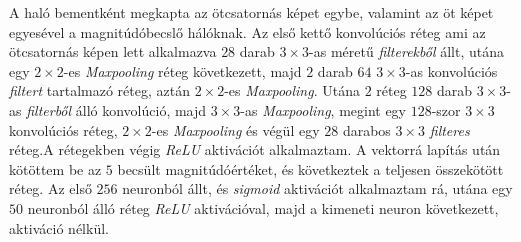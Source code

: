 \documentclass[12pt,letterpaper,oneside,openright]{book}
\begin{document}
A haló bementként megkapta az ötcsatornás képet egybe, valamint az öt képet egyesével a magnitúdóbecslő hálóknak. Az első kettő konvolúciós réteg ami az ötcsatornás képen lett alkalmazva $28$ darab $3\times3$-as méretű \textit{filterekből} állt, utána egy $2\times 2$-es \textit{Maxpooling} réteg következett, majd $2$ darab $64$ $3\times 3$-as konvolúciós \textit{filtert} tartalmazó réteg, aztán $2\times 2$-es \textit{Maxpooling}. Utána $2$ réteg $128$ darab $3\times 3$-as \textit{filterből} álló konvolúció, majd $3\times 3$-as \textit{Maxpooling}, megint egy $128$-szor $3\times 3$ konvolúciós réteg, $2\times 2$-es \textit{Maxpooling} és végül egy $28$ darabos $3\times 3$ \textit{filteres} réteg.A rétegekben végig \textit{ReLU} aktivációt alkalmaztam. A vektorrá lapítás után kötöttem be az $5$ becsült magnitúdóértéket, és következtek a teljesen összekötött réteg. Az első $256$ neuronból állt, és \textit{sigmoid} aktivációt alkalmaztam rá, utána egy $50$ neuronból álló réteg \textit{ReLU} aktivációval, majd a kimeneti neuron következett, aktiváció nélkül.
\end{document}
